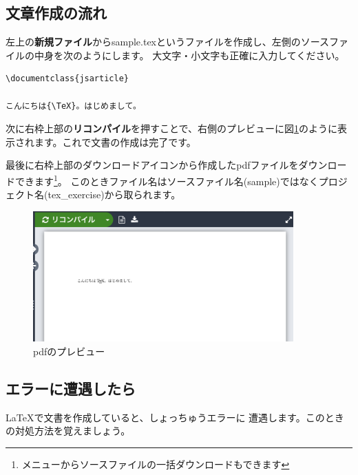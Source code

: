 \subsection{文章作成の流れ}
左上の\textbf{新規ファイル}からsample.texというファイルを作成し、左側のソースファイルの中身を次のようにします。
大文字・小文字も正確に入力してください。
\begin{screen}
\begin{verbatim}
\documentclass{jsarticle}

こんにちは{\TeX}。はじめまして。

\end{verbatim}
\end{screen}

次に右枠上部の\textbf{リコンパイル}を押すことで、右側のプレビューに図\ref{hello}のように表示されます。これで文書の作成は完了です。

最後に右枠上部のダウンロードアイコンから作成したpdfファイルをダウンロードできます\footnote{メニューからソースファイルの一括ダウンロードもできます}。
このときファイル名はソースファイル名(sample)ではなくプロジェクト名(tex\_exercise)から取られます。
\begin{figure}
  \centering
  \includegraphics[width=100mm]{hellotex.png}
  \caption{pdfのプレビュー\label{hello}}
\end{figure}

\subsection{エラーに遭遇したら}
{\LaTeX}で文書を作成していると、しょっちゅうエラーに
遭遇します。このときの対処方法を覚えましょう。

